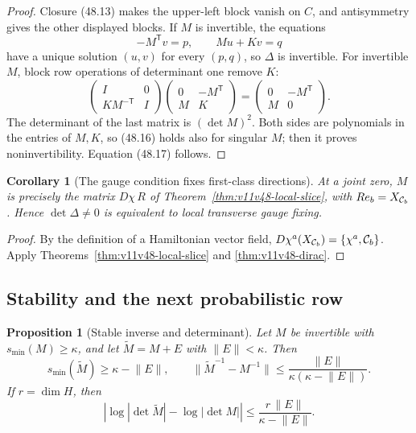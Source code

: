 \documentclass[11pt]{article}
\newtheorem{proposition}[theorem]{Proposition}
\newtheorem{corollary}[theorem]{Corollary}
\begin{document}
\begin{proof}
Closure (48.13) makes the upper-left block vanish on \(C\), and
antisymmetry gives the other displayed blocks.  If \(M\) is
invertible, the equations
\[
 -M^{\mathsf T}v=p,\qquad Mu+Kv=q
\]
have a unique solution \((u,v)\) for every \((p,q)\), so \(\Delta\)
is invertible.  For invertible \(M\), block row operations of determinant one remove
\(K\):
\[
 \begin{pmatrix}I&0\\ KM^{-\mathsf T}&I\end{pmatrix}
 \begin{pmatrix}0&-M^{\mathsf T}\\M&K\end{pmatrix}
 =\begin{pmatrix}0&-M^{\mathsf T}\\M&0\end{pmatrix}.           \tag{48.18}
\]
The determinant of the last matrix is \((\det M)^2\).
Both sides are polynomials in the entries of \(M,K\), so (48.16)
holds also for singular \(M\); then it proves noninvertibility.
Equation (48.17) follows.
\end{proof}



\begin{corollary}[The gauge condition fixes first-class directions]
\label{cor:v11v48-first-class}
At a joint zero, \(M\) is precisely the matrix \(D\chi\,R\) of
Theorem~\ref{thm:v11v48-local-slice}, with \(R e_b=X_{{\cal C}_b}\).
Hence \(\det\Delta\ne0\) is equivalent to local transverse gauge
fixing.
\end{corollary}

\begin{proof}
By the definition of a Hamiltonian vector field,
\(D\chi^a(X_{{\cal C}_b})=\{\chi^a,{\cal C}_b\}\).
Apply Theorems~\ref{thm:v11v48-local-slice} and
\ref{thm:v11v48-dirac}.
\end{proof}

\subsection{Stability and the next probabilistic row}

\begin{proposition}[Stable inverse and determinant]
\label{prop:v11v48-stable}
Let \(M\) be invertible with \(s_{\min}(M)\ge\kappa\), and let
\(\widetilde M=M+E\) with \(\lVert E\rVert<\kappa\).  Then
\[
 s_{\min}(\widetilde M)\ge\kappa-\lVert E\rVert,\qquad
 \lVert\widetilde M^{-1}-M^{-1}\rVert
 \le\frac{\lVert E\rVert}
          {\kappa(\kappa-\lVert E\rVert)}.                    \tag{48.19}
\]
If \(r=\dim H\), then
\[
 \left|\log|\det\widetilde M|-\log|\det M|\right|
 \le\frac{r\,\lVert E\rVert}
          {\kappa-\lVert E\rVert}.                            \tag{48.20}
\]
\end{proposition}
\end{document}
